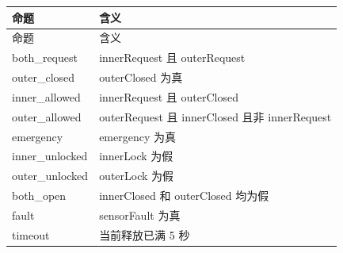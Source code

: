 \begin{longtable}{L{3.3cm}L{10.0cm}}

\toprule

命题 & 含义\\

\midrule

\endfirsthead

\toprule

命题 & 含义\\

\midrule

\endhead

{\ttfamily both\_request} & innerRequest 且 outerRequest\\

{\ttfamily outer\_closed} & outerClosed 为真\\

{\ttfamily inner\_allowed} & innerRequest 且 outerClosed\\

{\ttfamily outer\_allowed} & outerRequest 且 innerClosed 且非 innerRequest\\

{\ttfamily emergency} & emergency 为真\\

{\ttfamily inner\_unlocked} & innerLock 为假\\

{\ttfamily outer\_unlocked} & outerLock 为假\\

{\ttfamily both\_open} & innerClosed 和 outerClosed 均为假\\

{\ttfamily fault} & sensorFault 为真\\

{\ttfamily timeout} & 当前释放已满 5 秒\\

\bottomrule

\end{longtable}

